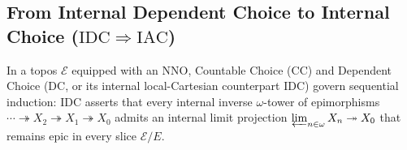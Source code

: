 \documentclass[10pt,twoside,openright]{book}
\theoremstyle{crmplain}
\theoremstyle{crmdef}
\theoremstyle{crmremark}
\begin{document}
\subsection{\texorpdfstring{From Internal Dependent Choice to Internal Choice ($\mathrm{IDC} \Rightarrow \mathrm{IAC}$)}{From Internal Dependent Choice to Internal Choice (IDC => IAC)}}

In a topos $\mathcal{E}$ equipped with an $\mathrm{NNO}$, Countable Choice ($\mathrm{CC}$) and Dependent Choice ($\mathrm{DC}$, or its internal local-Cartesian counterpart $\mathrm{IDC}$) govern sequential induction: $\mathrm{IDC}$ asserts that every internal inverse $\omega$-tower of epimorphisms $\cdots \twoheadrightarrow X_2 \twoheadrightarrow X_1 \twoheadrightarrow X_0$ admits an internal limit projection $\varprojlim_{n \in \omega} X_n \twoheadrightarrow X_0$ that remains epic in every slice $\mathcal{E}/E$.
\end{document}
